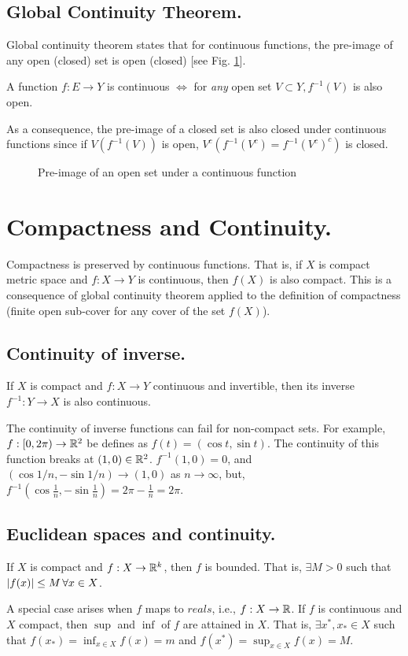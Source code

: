 \subsection{Global Continuity Theorem.}
Global continuity theorem states that for continuous functions, the pre-image of any open (closed) set is open (closed) [see Fig. \ref{fig:gct}].
\begin{theorem}
A function $f:E\to Y$ is continuous $\iff$ for \emph{any} open set $V\subset Y, f^{-1}(V)$ is also open.
\end{theorem}
As a consequence, the pre-image of a closed set is also closed under continuous functions since if $V (f^{-1}(V))$  is open, $V^c (f^{-1}(V^c) = f^{-1}(V^c)^c)$ is closed.
\begin{figure}[!ht]
    \centering
    \scalebox{0.80}{}
    \caption{Pre-image of an open set under a continuous function}
    \label{fig:gct}
\end{figure}

\section{Compactness and Continuity.}
Compactness is preserved by continuous functions.
That is, if $X$ is  compact metric space and $f:X\to Y$ is continuous, then $f(X)$ is also compact.
This is a consequence of global continuity theorem applied to the definition of compactness (finite open sub-cover for any cover of the set $f(X)$).

\subsection{Continuity of inverse.}
If $X$ is compact and $f:X\to Y$ continuous and invertible, then its inverse $f^{-1}:Y\to X$ is also continuous.

The continuity of inverse functions can fail for non-compact sets.
For example, $f:[0,2\pi)\to\mathbb{R}^2$ be defines as $f(t) = (\cos{t},\sin{t})$.
The continuity of this function breaks at $(1,0)\in\mathbb{R}^2$.
$f^{-1}(1,0)=0$, and $\left(\cos{1/n},-\sin{1/n}\right)\to (1,0)$ as $n\to\infty$, but, $f^{-1}\left(\cos{\frac{1}{n}},-\sin{\frac{1}{n}}\right)= 2\pi-\frac{1}{n}=2\pi$. 

\subsection{Euclidean spaces and continuity.}
If $X$ is compact and $f:X\to \mathbb{R}^k$, then $f$ is bounded.
That is, $\exists M>0$ such that $\left\lvert f(x)\right\rvert\leq M\,\forall x\in X$.
\begin{remark}
A special case arises when $f$ maps to $reals$, i.e., $f:X\to \mathbb{R}$.
If $f$ is continuous and $X$ compact, then $\sup$ and $\inf$ of $f$ are attained in $X$.
That is, $\exists x^*,x_*\in X$ such that $f(x_*)=\inf_{x\in X}f(x)=m$ and $f(x^*)=\sup_{x\in X}f(x)=M$. 
\end{remark}


